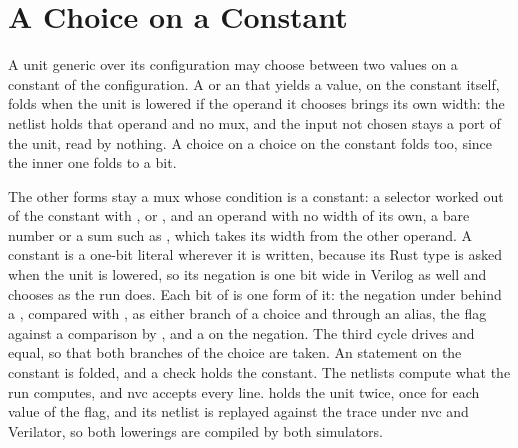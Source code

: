 \section{A Choice on a Constant}
\label{sec:x-const-mux}

A unit generic over its configuration may choose between two values on
a constant of the configuration. A  or an  that
yields a value, on the constant itself, folds when the unit is lowered
if the operand it chooses brings its own width: the netlist holds that
operand and no mux, and the input not chosen stays a port of the unit,
read by nothing. A choice on a choice on the constant folds too, since
the inner one folds to a bit.

The other forms stay a mux whose condition is a constant: a selector
worked out of the constant with \code{!}, \code{\&} or \code{==}, and an operand
with no width of its own, a bare number or a sum such as ,
which takes its width from the other operand. A  constant
is a one-bit literal wherever it is written, because its Rust type is
asked when the unit is lowered, so its negation is one bit wide in
Verilog as well and chooses as the run does. Each bit of  is
one form of it: the negation under \code{\&\&} behind a ,
compared with , as either branch of a choice and through an
alias, the flag against a comparison by \code{!=}, and a 
on the negation. The third cycle drives  and  equal,
so that both branches of the choice are taken. An  statement
on the constant is folded, and a check holds the constant. The
netlists compute what the run computes, and nvc accepts every line.
 holds the unit twice, once for each value of the flag, and
its netlist is replayed against the trace under nvc and Verilator, so
both lowerings are compiled by both simulators.




